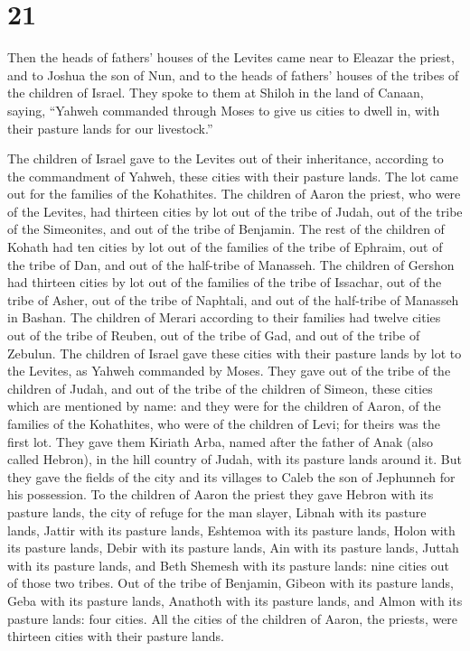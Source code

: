 \hypertarget{section-20}{%
\section{21}\label{section-20}}

 Then the heads of fathers' houses of the Levites came
near to Eleazar the priest, and to Joshua the son of Nun, and to the
heads of fathers' houses of the tribes of the children of Israel.
 They spoke to them at Shiloh in the land of Canaan,
saying, ``Yahweh commanded through Moses to give us cities to dwell in,
with their pasture lands for our livestock.''

 The children of Israel gave to the Levites out of their
inheritance, according to the commandment of Yahweh, these cities with
their pasture lands.  The lot came out for the families of
the Kohathites. The children of Aaron the priest, who were of the
Levites, had thirteen cities by lot out of the tribe of Judah, out of
the tribe of the Simeonites, and out of the tribe of Benjamin.
 The rest of the children of Kohath had ten cities by lot
out of the families of the tribe of Ephraim, out of the tribe of Dan,
and out of the half-tribe of Manasseh.  The children of
Gershon had thirteen cities by lot out of the families of the tribe of
Issachar, out of the tribe of Asher, out of the tribe of Naphtali, and
out of the half-tribe of Manasseh in Bashan.  The children
of Merari according to their families had twelve cities out of the tribe
of Reuben, out of the tribe of Gad, and out of the tribe of Zebulun.
 The children of Israel gave these cities with their
pasture lands by lot to the Levites, as Yahweh commanded by Moses.
 They gave out of the tribe of the children of Judah, and
out of the tribe of the children of Simeon, these cities which are
mentioned by name:  and they were for the children of
Aaron, of the families of the Kohathites, who were of the children of
Levi; for theirs was the first lot.  They gave them
Kiriath Arba, named after the father of Anak (also called Hebron), in
the hill country of Judah, with its pasture lands around it.
 But they gave the fields of the city and its villages to
Caleb the son of Jephunneh for his possession.  To the
children of Aaron the priest they gave Hebron with its pasture lands,
the city of refuge for the man slayer, Libnah with its pasture lands,
 Jattir with its pasture lands, Eshtemoa with its pasture
lands,  Holon with its pasture lands, Debir with its
pasture lands,  Ain with its pasture lands, Juttah with
its pasture lands, and Beth Shemesh with its pasture lands: nine cities
out of those two tribes.  Out of the tribe of Benjamin,
Gibeon with its pasture lands, Geba with its pasture lands,
 Anathoth with its pasture lands, and Almon with its
pasture lands: four cities.  All the cities of the
children of Aaron, the priests, were thirteen cities with their pasture
lands.

